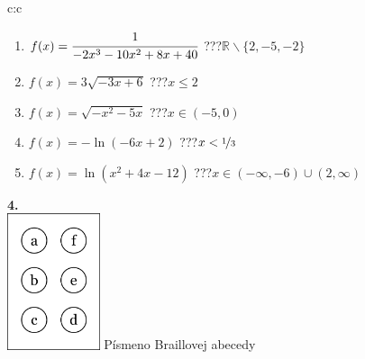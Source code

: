 \documentclass[10pt]{report}
\begin{document}
\begin{tabular}{c:c}
\begin{minipage}[c][104.5mm][t]{0.5\linewidth}
\begin{center}
\begin{minipage}{0.79\linewidth}
\begin{center}
\begin{varwidth}{\linewidth}
\begin{enumerate}
\item $f(x)=\cfrac{1}{-2x^3-10x^2+8x+40}$\quad \dotfill\; ???\;\dotfill \quad $\mathbb{R}\smallsetminus\{2,-5,-2\}$
\item $f(x)=3\sqrt{-3x+6}$\quad \dotfill\; ???\;\dotfill \quad $x\leq2$
\item $f(x)=\sqrt{-x^2-5x}$\quad \dotfill\; ???\;\dotfill \quad $x\in(-5 , 0)$
\item $f(x)=-\ln{(-6x+2)}$\quad \dotfill\; ???\;\dotfill \quad $x<\nicefrac{1}{3}$
\item $f(x)=\ln{(x^2+4x-12)}$\quad \dotfill\; ???\;\dotfill \quad $x\in(-\infty , -6)\cup(2 , \infty)$
\end{enumerate}
\end{varwidth}
\end{center}
\end{minipage}
\begin{minipage}{0.20\linewidth}
\begin{center}
{\Huge\bfseries 4.} \\[2mm]
\includegraphics[height=40mm]{../images/braille.png}
{\small Písmeno Braillovej abecedy}
\end{center}
\end{minipage}
\end{center}
\end{minipage}
%
\end{tabular}
\newpage
\thispagestyle{empty}
\end{document}
